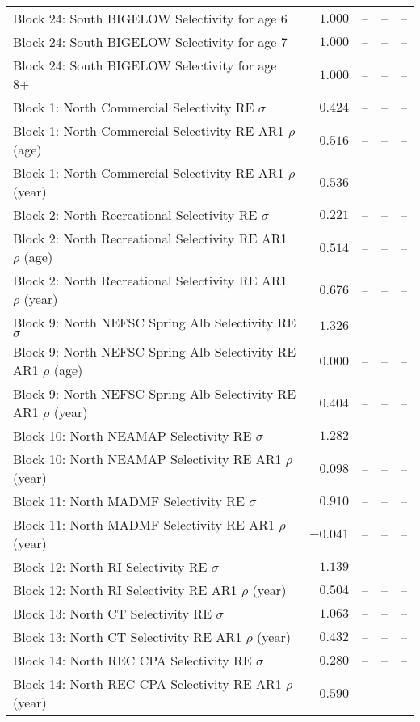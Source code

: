 \documentclass[
]{article}
\begin{document}
\begin{landscape}
\begin{longtable}[t]{lrrrr}
Block 24: South BIGELOW Selectivity for age 6 & $1.000$ & -- & -- & --\\
Block 24: South BIGELOW Selectivity for age 7 & $1.000$ & -- & -- & --\\
Block 24: South BIGELOW Selectivity for age 8+ & $1.000$ & -- & -- & --\\
Block 1: North Commercial Selectivity RE $\sigma$ & $0.424$ & -- & -- & --\\
\addlinespace
Block 1: North Commercial Selectivity RE AR1 $\rho$ (age) & $0.516$ & -- & -- & --\\
Block 1: North Commercial Selectivity RE AR1 $\rho$ (year) & $0.536$ & -- & -- & --\\
Block 2: North Recreational Selectivity RE $\sigma$ & $0.221$ & -- & -- & --\\
Block 2: North Recreational Selectivity RE AR1 $\rho$ (age) & $0.514$ & -- & -- & --\\
Block 2: North Recreational Selectivity RE AR1 $\rho$ (year) & $0.676$ & -- & -- & --\\
\addlinespace
Block 9: North NEFSC Spring Alb Selectivity RE $\sigma$ & $1.326$ & -- & -- & --\\
Block 9: North NEFSC Spring Alb Selectivity RE AR1 $\rho$ (age) & $0.000$ & -- & -- & --\\
Block 9: North NEFSC Spring Alb Selectivity RE AR1 $\rho$ (year) & $0.404$ & -- & -- & --\\
Block 10: North NEAMAP Selectivity RE $\sigma$ & $1.282$ & -- & -- & --\\
Block 10: North NEAMAP Selectivity RE AR1 $\rho$ (year) & $0.098$ & -- & -- & --\\
\addlinespace
Block 11: North MADMF Selectivity RE $\sigma$ & $0.910$ & -- & -- & --\\
Block 11: North MADMF Selectivity RE AR1 $\rho$ (year) & $-0.041$ & -- & -- & --\\
Block 12: North RI Selectivity RE $\sigma$ & $1.139$ & -- & -- & --\\
Block 12: North RI Selectivity RE AR1 $\rho$ (year) & $0.504$ & -- & -- & --\\
Block 13: North CT Selectivity RE $\sigma$ & $1.063$ & -- & -- & --\\
\addlinespace
Block 13: North CT Selectivity RE AR1 $\rho$ (year) & $0.432$ & -- & -- & --\\
Block 14: North REC CPA Selectivity RE $\sigma$ & $0.280$ & -- & -- & --\\
Block 14: North REC CPA Selectivity RE AR1 $\rho$ (year) & $0.590$ & -- & -- & --\\

\end{longtable}
\end{landscape}
\end{document}

